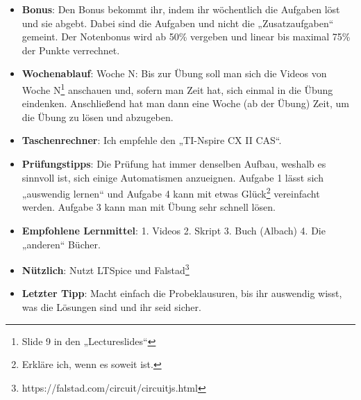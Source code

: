 \documentclass[11pt,a4paper]{article}
\begin{document}
\begin{itemize}
    \item \textbf{Bonus}: Den Bonus bekommt ihr, indem ihr wöchentlich die Aufgaben löst und sie abgebt. Dabei sind die Aufgaben und nicht die „Zusatzaufgaben“ gemeint. Der Notenbonus wird ab 50\% vergeben und linear bis maximal 75\% der Punkte verrechnet.
    \item \textbf{Wochenablauf}: Woche N: Bis zur Übung soll man sich die Videos von Woche N\footnote{Slide 9 in den „Lectureslides“} anschauen und, sofern man Zeit hat, sich einmal in die Übung eindenken. Anschließend hat man dann eine Woche (ab der Übung) Zeit, um die Übung zu lösen und abzugeben.
    \item \textbf{Taschenrechner}: Ich empfehle den „TI-Nspire CX II CAS“.
    \item \textbf{Prüfungstipps}: Die Prüfung hat immer denselben Aufbau, weshalb es sinnvoll ist, sich einige Automatismen anzueignen. Aufgabe 1 lässt sich „auswendig lernen“ und Aufgabe 4 kann mit etwas Glück\footnote{Erkläre ich, wenn es soweit ist.} vereinfacht werden. Aufgabe 3 kann man mit Übung sehr schnell lösen.
    \item \textbf{Empfohlene Lernmittel}: 1. Videos 2. Skript 3. Buch (Albach) 4. Die „anderen“ Bücher.
    \item \textbf{Nützlich}: Nutzt LTSpice und Falstad\footnote{https://falstad.com/circuit/circuitjs.html}
    \item \textbf{Letzter Tipp}: Macht einfach die Probeklausuren, bis ihr auswendig wisst, was die Lösungen sind und ihr seid sicher. 
\end{itemize}
\end{document}
